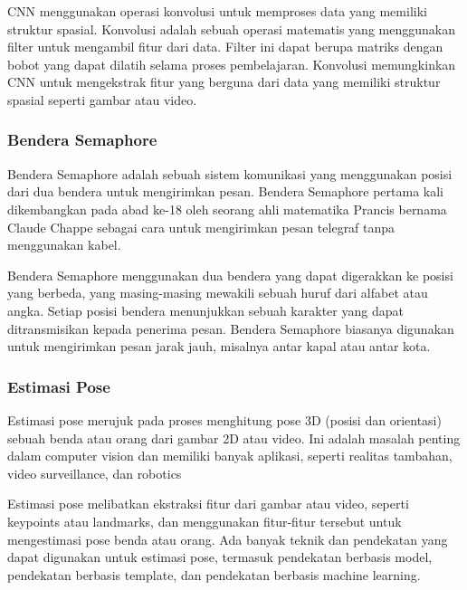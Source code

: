 CNN menggunakan operasi konvolusi untuk memproses data yang memiliki struktur spasial. Konvolusi adalah sebuah operasi matematis yang menggunakan filter untuk mengambil fitur dari data. Filter ini dapat berupa matriks dengan bobot yang dapat dilatih selama proses pembelajaran. Konvolusi memungkinkan CNN untuk mengekstrak fitur yang berguna dari data yang memiliki struktur spasial seperti gambar atau video.

\subsubsection{Bendera Semaphore}
Bendera Semaphore adalah sebuah sistem komunikasi yang menggunakan posisi dari dua bendera untuk mengirimkan pesan. Bendera Semaphore pertama kali dikembangkan pada abad ke-18 oleh seorang ahli matematika Prancis bernama Claude Chappe sebagai cara untuk mengirimkan pesan telegraf tanpa menggunakan kabel.

Bendera Semaphore menggunakan dua bendera yang dapat digerakkan ke posisi yang berbeda, yang masing-masing mewakili sebuah huruf dari alfabet atau angka. Setiap posisi bendera menunjukkan sebuah karakter yang dapat ditransmisikan kepada penerima pesan. Bendera Semaphore biasanya digunakan untuk mengirimkan pesan jarak jauh, misalnya antar kapal atau antar kota.

\subsubsection{Estimasi Pose}

Estimasi pose merujuk pada proses menghitung pose 3D (posisi dan orientasi) sebuah benda atau orang dari gambar 2D atau video. Ini adalah masalah penting dalam computer vision dan memiliki banyak aplikasi, seperti realitas tambahan, video surveillance, dan robotics

Estimasi pose melibatkan ekstraksi fitur dari gambar atau video, seperti keypoints atau landmarks, dan menggunakan fitur-fitur tersebut untuk mengestimasi pose benda atau orang. Ada banyak teknik dan pendekatan yang dapat digunakan untuk estimasi pose, termasuk pendekatan berbasis model, pendekatan berbasis template, dan pendekatan berbasis machine learning.